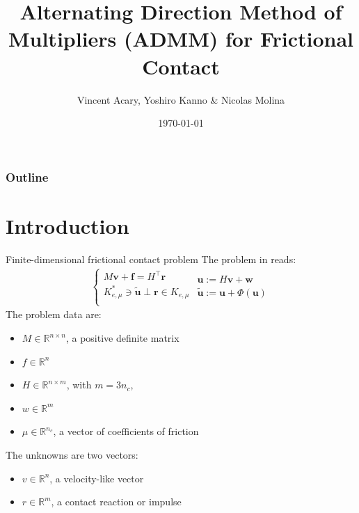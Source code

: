 \documentclass[8pt,red]{beamer}
\title{Alternating Direction Method of Multipliers (ADMM) for Frictional Contact}
\author{Vincent Acary, Yoshiro Kanno \& Nicolas Molina}
\date{\today }
\theoremstyle{plain}
\theoremstyle{definition}
\theoremstyle{remark}
\renewcommand{\Re}{\ensuremath{\mathbb{R}}}
\newcommand{\bi}[1]{\ensuremath{\boldsymbol{#1}}}
\begin{document}
{
}

\begin{frame}
\frametitle{Outline}
\small 
\tableofcontents[hideallsubsections]
\end{frame}


\section{Introduction}
\begin{frame}{Finite-dimensional frictional contact problem}
The problem in \citep{Acary2013} reads:
\begin{align}
	\begin{cases}
	M \bi{v} + \bi{f} = H^{\top} \bi{r}  \\
	K_{e,\mu}^{*}\ni \tilde{\bi{u}} \perp \bi{r} \in K_{e,\mu} \\
	\end{cases}
	\begin{array}{l}
	\bi{u} := H \bi{v} + \bi{w} \\
	\tilde{\bi{u}} := \bi{u} + \Phi(\bi{u})
	\end{array}
	\label{CF.complementary}
\end{align}
The problem data are:
\begin{itemize}
\item $M \in \Re^{n \times n}$, a positive definite matrix 
\item $f \in \Re^{n}$
\item $H \in \Re^{n \times m}$, with $m = 3n_{c}$,
\item $w \in \Re^{m}$
\item $\mu \in \Re^{n_{c}}$, a vector of coefficients of friction 
\end{itemize}
The unknowns are two vectors:
\begin{itemize}
\item $v \in \Re^{n}$, a velocity-like vector
\item $r \in \Re^{m}$, a contact reaction or impulse
\end{itemize}
\end{frame}
\end{document}
